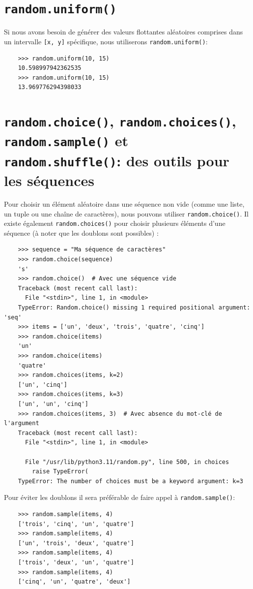 \documentclass[a4paper,11pt]{book}
\begin{document}
\section{\texttt{random.uniform()}}
Si nous avons besoin de générer des valeurs flottantes aléatoires comprises dans un intervalle \texttt{[x, y]} spécifique, nous utiliserons \texttt{random.uniform()}:
\begin{verbatim}
    >>> random.uniform(10, 15)
    10.598997942362535
    >>> random.uniform(10, 15)
    13.969776294398033
\end{verbatim}

\section{\texttt{random.choice()}, \texttt{random.choices()}, \texttt{random.sample()} et \\ \texttt{random.shuffle()}: des outils pour les séquences}
Pour choisir un élément aléatoire dans une séquence non vide (comme une liste, un tuple ou une chaîne de caractères), nous pouvons utiliser \texttt{random.choice()}. Il existe également \texttt{random.choices()} pour choisir plusieurs éléments d'une séquence (à noter que les doublons sont possibles) :
\begin{verbatim}
    >>> sequence = "Ma séquence de caractères"
    >>> random.choice(sequence)
    's'
    >>> random.choice()  # Avec une séquence vide
    Traceback (most recent call last):
      File "<stdin>", line 1, in <module>
    TypeError: Random.choice() missing 1 required positional argument: 'seq'
    >>> items = ['un', 'deux', 'trois', 'quatre', 'cinq']
    >>> random.choice(items)
    'un'
    >>> random.choice(items)
    'quatre'
    >>> random.choices(items, k=2)
    ['un', 'cinq']
    >>> random.choices(items, k=3)
    ['un', 'un', 'cinq']
    >>> random.choices(items, 3)  # Avec absence du mot-clé de l'argument
    Traceback (most recent call last):
      File "<stdin>", line 1, in <module>
      
      File "/usr/lib/python3.11/random.py", line 500, in choices
        raise TypeError(
    TypeError: The number of choices must be a keyword argument: k=3
\end{verbatim}
\medskip

Pour éviter les doublons il sera préférable de faire appel à \texttt{random.sample()}:
\begin{verbatim}
    >>> random.sample(items, 4)
    ['trois', 'cinq', 'un', 'quatre']
    >>> random.sample(items, 4)
    ['un', 'trois', 'deux', 'quatre']
    >>> random.sample(items, 4)
    ['trois', 'deux', 'un', 'quatre']
    >>> random.sample(items, 4)
    ['cinq', 'un', 'quatre', 'deux']
\end{verbatim}
\medskip
\end{document}
